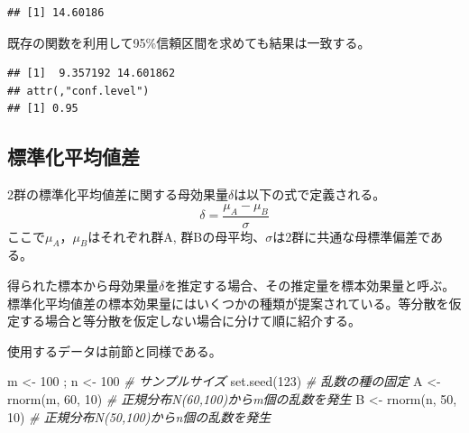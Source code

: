 \documentclass[
  ja=standard, xelatex, base=12pt]{bxjsreport}
\newenvironment{Shaded}{\begin{snugshade}}{\end{snugshade}}
\newcommand{\AttributeTok}[1]{\textcolor[rgb]{0.77,0.63,0.00}{#1}}
\newcommand{\CommentTok}[1]{\textcolor[rgb]{0.56,0.35,0.01}{\textit{#1}}}
\newcommand{\DecValTok}[1]{\textcolor[rgb]{0.00,0.00,0.81}{#1}}
\newcommand{\FunctionTok}[1]{\textcolor[rgb]{0.00,0.00,0.00}{#1}}
\newcommand{\NormalTok}[1]{#1}
\newcommand{\OtherTok}[1]{\textcolor[rgb]{0.56,0.35,0.01}{#1}}
\newcommand{\SpecialCharTok}[1]{\textcolor[rgb]{0.00,0.00,0.00}{#1}}
\begin{document}
\begin{verbatim}
## [1] 14.60186
\end{verbatim}

既存の関数を利用して95\%信頼区間を求めても結果は一致する。

\begin{Shaded}
\end{Shaded}

\begin{verbatim}
## [1]  9.357192 14.601862
## attr(,"conf.level")
## [1] 0.95
\end{verbatim}

\hypertarget{ux6a19ux6e96ux5316ux5e73ux5747ux5024ux5dee}{%
\subsection{標準化平均値差}\label{ux6a19ux6e96ux5316ux5e73ux5747ux5024ux5dee}}

2群の標準化平均値差に関する母効果量\(\delta\)は以下の式で定義される。 \[
\delta=\frac{μ_A-μ_B}{σ}
\]ここで\(μ_A\)，\(μ_B\)はそれぞれ群A, 群Bの母平均、\(σ\)は2群に共通な母標準偏差である。

得られた標本から母効果量\(\delta\)を推定する場合、その推定量を標本効果量と呼ぶ。 標準化平均値差の標本効果量にはいくつかの種類が提案されている。等分散を仮定する場合と等分散を仮定しない場合に分けて順に紹介する。

使用するデータは前節と同様である。

\begin{Shaded}
\begin{Highlighting}[]
\NormalTok{m }\OtherTok{\textless{}{-}} \DecValTok{100}\NormalTok{ ; n }\OtherTok{\textless{}{-}} \DecValTok{100}   \CommentTok{\# サンプルサイズ}
\FunctionTok{set.seed}\NormalTok{(}\DecValTok{123}\NormalTok{)         }\CommentTok{\# 乱数の種の固定}
\NormalTok{A }\OtherTok{\textless{}{-}} \FunctionTok{rnorm}\NormalTok{(m, }\DecValTok{60}\NormalTok{, }\DecValTok{10}\NormalTok{) }\CommentTok{\# 正規分布N(60,100)からm個の乱数を発生}
\NormalTok{B }\OtherTok{\textless{}{-}} \FunctionTok{rnorm}\NormalTok{(n, }\DecValTok{50}\NormalTok{, }\DecValTok{10}\NormalTok{) }\CommentTok{\# 正規分布N(50,100)からn個の乱数を発生}
\end{Highlighting}
\end{Shaded}
\end{document}
